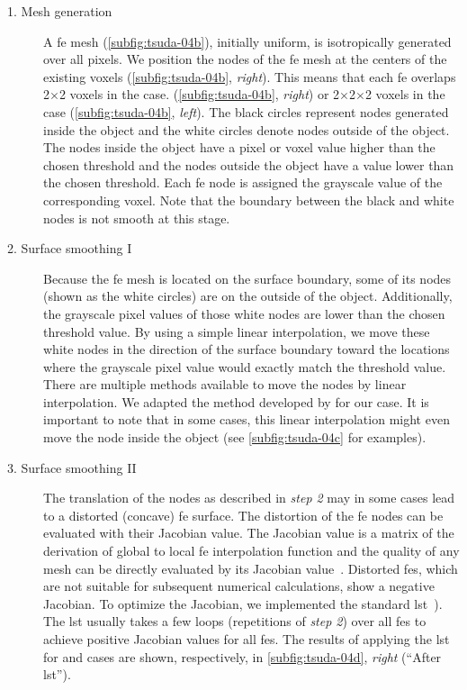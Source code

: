 \begin{description}
	\item[1. Mesh generation] A \ac{fe} mesh (\autoref{subfig:tsuda-04b}), initially uniform, is isotropically generated over all pixels. We position the nodes of the \ac{fe} mesh at the centers of the existing voxels (\autoref{subfig:tsuda-04b}, \textit{right}). This means that each \ac{fe} overlaps 2$\times$2 voxels in the \twod case. (\autoref{subfig:tsuda-04b}, \textit{right}) or 2$\times$2$\times$2 voxels in the \threed case (\autoref{subfig:tsuda-04b}, \textit{left}). The black circles represent nodes generated inside the object and the white circles denote nodes outside of the object. The nodes inside the object have a pixel or voxel value higher than the chosen threshold and the nodes outside the object have a value lower than the chosen threshold. Each \ac{fe} node is assigned the grayscale value of the corresponding voxel. Note that the boundary between the black and white nodes is not smooth at this stage.
	\item[2. Surface smoothing I] Because the \ac{fe} mesh is located on the surface boundary, some of its nodes (shown as the white circles) are on the outside of the object. Additionally, the grayscale pixel values of those white nodes are lower than the chosen threshold value. By using a simple linear interpolation, we move these white nodes in the direction of the surface boundary toward the locations where the grayscale pixel value would exactly match the threshold value. There are multiple methods available to move the nodes by linear interpolation. We adapted the method developed by \citet{Schneiders1996} for our \threed case. It is important to note that in some cases, this linear interpolation might even move the node inside the object (see \autoref{subfig:tsuda-04c} for examples).
	\item[3. Surface smoothing II] The translation of the nodes as described in \textit{step 2} may in some cases lead to a distorted (concave) \ac{fe} surface. The distortion of the \ac{fe} nodes can be evaluated with their Jacobian value. The Jacobian value is a matrix of the derivation of global to local \ac{fe} interpolation function and the quality of any mesh can be directly evaluated by its Jacobian value~\cite{Bathe1995}. Distorted \acp{fe}, which are not suitable for subsequent numerical calculations, show a negative Jacobian. To optimize the Jacobian, we implemented the standard \ac{lst}~\cite{Freitag2000}). The \ac{lst} usually takes a few loops (repetitions of \textit{step 2}) over all \acp{fe} to achieve positive Jacobian values for all \acp{fe}. The results of applying the \ac{lst} for \threed and \twod cases are shown, respectively, in \autoref{subfig:tsuda-04d}, \textit{right} (``After \ac{lst}'').
\end{description}


